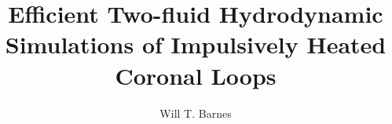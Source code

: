 \documentclass[12pt]{ruthesis}
\title{Efficient Two-fluid Hydrodynamic Simulations of Impulsively Heated Coronal Loops}
\author{Will T. Barnes}
\begin{document}
  \begin{frontmatter}
   \maketitle
   
   {%
   \tableofcontents
   \listoffigures
   \listoftables
	}
  \end{frontmatter}









\appendix

%
%
%
%



\end{document}
